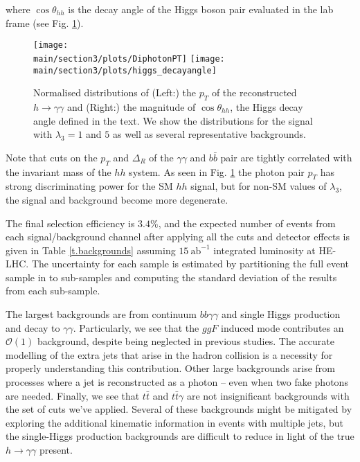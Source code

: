 where $\cos\theta_{hh}$ is the decay angle of the Higgs boson pair evaluated in the lab frame (see Fig. \ref{fig:kinematics}).

\begin{figure}[ht]
\centering
	\texttt{[image: \\main/section3/plots/DiphotonPT]}%
\hfill
	\texttt{[image: \\main/section3/plots/higgs\_decayangle]}%
\caption{Normalised distributions of (Left:) the $p_T$ of the reconstructed $h\rightarrow\gamma\gamma$ and (Right:) the magnitude of $\cos\theta_{hh}$, the Higgs decay angle defined in the text. We show the distributions for the signal with $\lambda_{3} = 1$ and $5$ as well as several representative backgrounds.}
\label{fig:kinematics}
\end{figure}

Note that cuts on the $p_T$ and $\Delta_R$ of the $\gamma\gamma$ and $b\bar{b}$ pair are tightly correlated with the invariant mass of the $hh$ system. As seen in Fig. \ref{fig:kinematics} the photon pair $p_T$ has strong discriminating power for the SM $hh$ signal, but for non-SM values of $\lambda_{3}$, the signal and background become more degenerate.

The final selection efficiency is $3.4 \%$, and the expected number of events from each signal/background channel after applying all the cuts and detector effects is given in Table \ref{t.backgrounds} assuming $15~\text{ab}^{-1}$ integrated luminosity at HE-LHC. The uncertainty for each sample is estimated by partitioning the full event sample in to sub-samples and computing the standard deviation of the results from each sub-sample.

The largest backgrounds are from continuum $bb\gamma\gamma$ and single Higgs production and decay to $\gamma\gamma$. Particularly, we see that the $ggF$ induced mode contributes an $\mathcal{O}(1)$ background, despite being neglected in previous studies. The accurate modelling of the extra jets that arise in the hadron collision is a necessity for properly understanding this contribution.
Other large backgrounds arise from processes where a jet is reconstructed as a photon -- even when two fake photons are needed. Finally, we see that $t\bar{t}$ and $t\bar{t}\gamma$ are not insignificant backgrounds with the set of cuts we've applied. Several of these backgrounds might be mitigated by exploring the additional kinematic information in events with multiple jets, but the single-Higgs production backgrounds are difficult to reduce in light of the true $h\rightarrow \gamma\gamma$ present.

